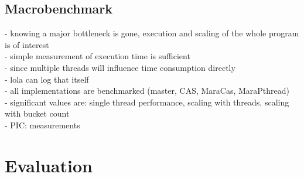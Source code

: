 \subsection{Macrobenchmark}
- knowing a major bottleneck is gone, execution and scaling of the whole program is of interest\\
- simple measurement of execution time is sufficient\\
- since multiple threads will influence time consumption directly\\
- lola can log that itself\\
- all implementations are benchmarked (master, CAS, MaraCas, MaraPthread)\\
- significant values are: single thread performance, scaling with threads, scaling with bucket count\\
- PIC: measurements\\

\section{Evaluation}